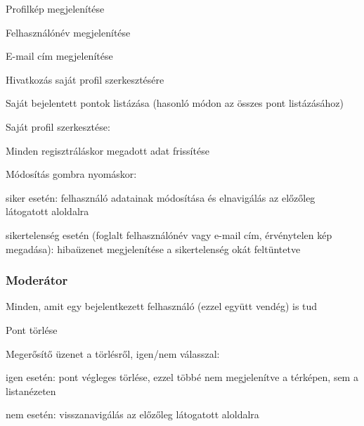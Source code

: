 \begin{compactitem}
\begin{compactitem}
		\item Profilkép megjelenítése
		\item Felhasználónév megjelenítése
		\item E-mail cím megjelenítése
		\item Hivatkozás saját profil szerkesztésére
		\item Saját bejelentett pontok listázása (hasonló módon az összes pont listázásához)
	\end{compactitem}
	\item Saját profil szerkesztése:
	\begin{compactitem}
		\item Minden regisztráláskor megadott adat frissítése
		\item Módosítás gombra nyomáskor:
		\begin{compactitem}
			\item siker esetén: felhasználó adatainak módosítása és elnavigálás az előzőleg látogatott aloldalra
			\item sikertelenség esetén (foglalt felhasználónév vagy e-mail cím, érvénytelen kép megadása): hibaüzenet megjelenítése a sikertelenség okát feltüntetve
		\end{compactitem}
	\end{compactitem}
\end{compactitem}

\subsubsection{Moderátor}
\begin{compactitem}
	\item Minden, amit egy bejelentkezett felhasználó (ezzel együtt vendég) is tud
	\item Pont törlése
	\begin{compactitem}
		\item Megerősítő üzenet a törlésről, igen/nem válasszal:
		\begin{compactitem}
			\item igen esetén: pont végleges törlése, ezzel többé nem megjelenítve a térképen, sem a listanézeten
			\item nem esetén: visszanavigálás az előzőleg látogatott aloldalra
		\end{compactitem}
	\end{compactitem}
\end{compactitem}

